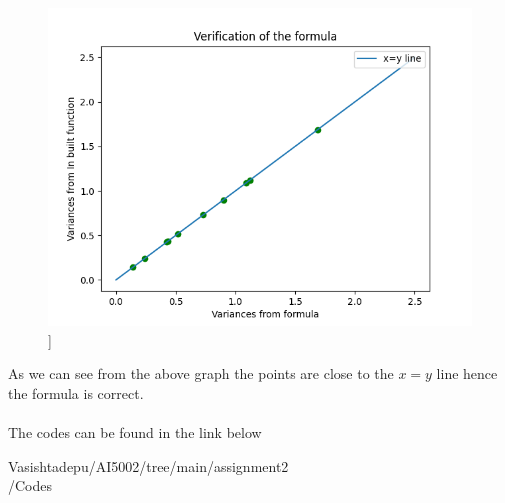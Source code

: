 \documentclass[journal,12pt,twocolumn]{IEEEtran}
\begin{document}
\begin{figure}[h]
\includegraphics[scale = 0.7]{ogimage}]
\end{figure}
As we can see from the above graph the points are close to the $x=y$ line hence the formula is correct.\\\\
The codes can be found in the link below

\begin{tcolorbox}{
Vasishtadepu/AI5002/tree/main/assignment2\\/Codes
}
\end{tcolorbox}
\end{document}
